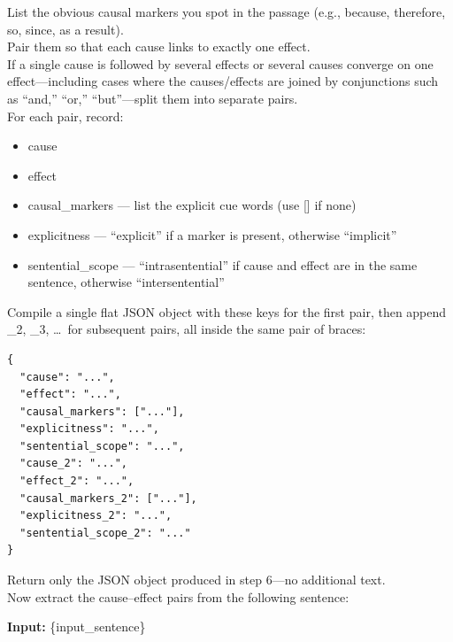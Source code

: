 \documentclass[conference]{IEEEtran}
\begin{document}
\begin{tcolorbox}[
  title=\textbf{4.  Experiment 2: Least to Most Prompt},
  colback=gray!5,
  colframe=black!75,
  fonttitle=\bfseries,
  breakable
]
List the obvious causal markers you spot in the passage (e.g., because, therefore, so, since, as a result).\\
Pair them so that each cause links to exactly one effect.\\
If a single cause is followed by several effects or several causes converge on one effect---including cases where the causes/effects are joined by conjunctions such as ``and,'' ``or,'' ``but''---split them into separate pairs.\\
For each pair, record:
\begin{itemize}
  \item cause
  \item effect
  \item causal\_markers --- list the explicit cue words (use [] if none)
  \item explicitness --- ``explicit'' if a marker is present, otherwise ``implicit''
  \item sentential\_scope --- ``intrasentential'' if cause and effect are in the same sentence, otherwise ``intersentential''
\end{itemize}
Compile a single flat JSON object with these keys for the first pair, then append \_2, \_3, \dots\ for subsequent pairs, all inside the same pair of braces:
\begin{verbatim}
{
  "cause": "...",
  "effect": "...",
  "causal_markers": ["..."],
  "explicitness": "...",
  "sentential_scope": "...",
  "cause_2": "...",
  "effect_2": "...",
  "causal_markers_2": ["..."],
  "explicitness_2": "...",
  "sentential_scope_2": "..."
}
\end{verbatim}
Return only the JSON object produced in step 6---no additional text.\\
Now extract the cause--effect pairs from the following sentence:

\textbf{Input:} \{input\_sentence\}
\end{tcolorbox}
\end{document}

